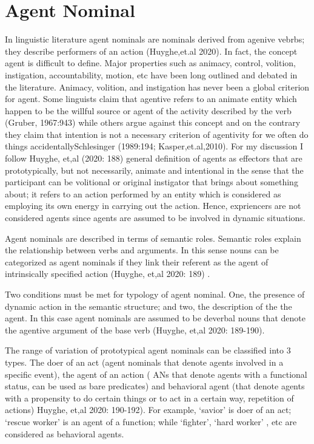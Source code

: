 \documentclass[11pt,a4paper]{article}
\begin{document}
\section{Agent Nominal}

In linguistic literature agent nominals are nominals derived from agenive vebrbs; they describe performers of an action (Huyghe,et.al 2020). In fact, the concept agent is difficult to define. Major properties  such as animacy, control, volition, instigation, accountability, motion, etc have been long outlined and debated in the literature. Animacy, volition, and instigation has never been a global criterion for agent. Some linguists claim that agentive refers to an animate entity which happen to be the willful source or agent of the activity described by the verb (Gruber, 1967:943) while others argue against this concept and on the contrary they claim that intention is not a necessary criterion of agentivity for we often do things accidentallySchlesinger (1989:194; Kasper,et.al,2010). For my discussion I follow Huyghe, et,al (2020: 188) general definition of agents as effectors that are prototypically, but not necessarily, animate and intentional in the sense that the participant can be volitional or original instigator that brings about something about; it refers to an action performed by an entity which is considered as employing its own energy in carrying out the action. Hence, expriencers are not considered  agents since agents are assumed to be involved in dynamic situations. 


Agent nominals are described in terms of  semantic roles. Semantic roles explain the relationship between verbs and arguments. In this sense nouns can be categorized as agent nominals if they link their referent as the agent of intrinsically specified action (Huyghe, et,al 2020: 189) . 

Two conditions must be met for typology of agent nominal. One, the presence of dynamic action in the semantic structure; and two, the description of the the agent. In this case agent nominals are assumed to be deverbal nouns that denote the agentive argument of the base verb (Huyghe, et,al 2020: 189-190).

The range of variation of prototypical agent nominals can be classified into 3 types. The doer of an act (agent nominals that denote agents involved in a specific event), the agent of an action ( ANs that denote agents with a functional status, can be used as bare predicates) and behavioral agent (that denote agents with a propensity to do certain things or to act in a certain way, repetition of actions) Huyghe, et,al 2020: 190-192). For example, ‘savior’  is doer of an act; ‘rescue worker’ is an agent of a function; while ‘fighter’, ‘hard worker’ , etc are considered as behavioral agents.
\end{document}
